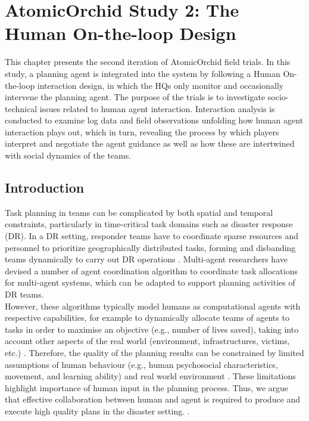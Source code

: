 \chapter{AtomicOrchid Study 2: The Human On-the-loop Design}\label{ch:studytwo} %
This chapter presents the second iteration of AtomicOrchid field trials. In this study, a planning agent is integrated into the system by following a Human On-the-loop interaction design, in which the HQs only monitor and occasionally intervene the planning agent. The purpose of the trials is to investigate socio-technical issues related to human agent interaction. Interaction analysis is conducted to examine log data and field observations unfolding how human agent interaction plays out, which in turn, revealing the process by which players interpret and negotiate the agent guidance as well as how these are intertwined with social dynamics of the teams.

\section{Introduction}\label{sec:studytwointroduction}
Task planning in teams can be complicated by both spatial and temporal constraints, particularly in time-critical task domains such as disaster response (DR). In a DR setting, responder teams have to coordinate sparse resources and personnel to prioritize geographically distributed tasks, forming and disbanding teams dynamically to carry out DR operations \cite{Chen2005}. Multi-agent researchers have devised a number of agent coordination algorithm to coordinate task allocations for multi-agent systems, which can be adapted to support planning activities of DR teams. \\

However, these algorithms typically model humans as computational agents with respective capabilities, for example to dynamically allocate teams of agents to tasks in order to maximise an objective (e.g., number of lives saved), taking into account other aspects of the real world (environment, infrastructures, victims, etc.) \cite{Ramchurn2010a}. Therefore, the quality of the planning results can be constrained by limited assumptions of human behaviour (e.g., human psychosocial characteristics, movement, and learning ability) and real world environment \cite{Armenakis2012}. These limitations highlight importance of human input in the planning process. Thus, we argue that effective collaboration between human and agent is required to produce and execute high quality plans in the disaster setting. . \\

